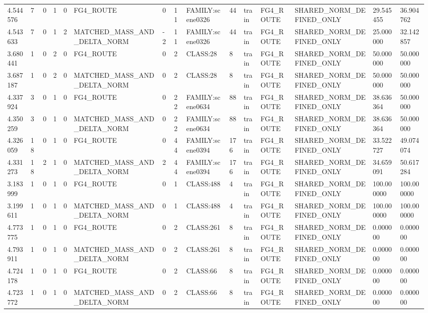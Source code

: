 \begin{tabular}{lllllllllllllll}
4.544576 & 7 & 0 & 1 & 0 & FG4\_ROUTE & 0 & 11 & FAMILY:scene0326 & 44 & train & FG4\_ROUTE & SHARED\_NORM\_DEFINED\_ONLY & 29.545455 & 36.904762 \\
4.543633 & 7 & 0 & 1 & 2 & MATCHED\_MASS\_AND\_DELTA\_NORM & -2 & 11 & FAMILY:scene0326 & 44 & train & FG4\_ROUTE & SHARED\_NORM\_DEFINED\_ONLY & 25.000000 & 32.142857 \\
3.680441 & 1 & 0 & 2 & 0 & FG4\_ROUTE & 0 & 2 & CLASS:28 & 8 & train & FG4\_ROUTE & SHARED\_NORM\_DEFINED\_ONLY & 50.000000 & 50.000000 \\
3.687187 & 1 & 0 & 2 & 0 & MATCHED\_MASS\_AND\_DELTA\_NORM & 0 & 2 & CLASS:28 & 8 & train & FG4\_ROUTE & SHARED\_NORM\_DEFINED\_ONLY & 50.000000 & 50.000000 \\
4.337924 & 3 & 0 & 1 & 0 & FG4\_ROUTE & 0 & 22 & FAMILY:scene0634 & 88 & train & FG4\_ROUTE & SHARED\_NORM\_DEFINED\_ONLY & 38.636364 & 50.000000 \\
4.350259 & 3 & 0 & 1 & 0 & MATCHED\_MASS\_AND\_DELTA\_NORM & 0 & 22 & FAMILY:scene0634 & 88 & train & FG4\_ROUTE & SHARED\_NORM\_DEFINED\_ONLY & 38.636364 & 50.000000 \\
4.326059 & 18 & 0 & 1 & 0 & FG4\_ROUTE & 0 & 44 & FAMILY:scene0394 & 176 & train & FG4\_ROUTE & SHARED\_NORM\_DEFINED\_ONLY & 33.522727 & 49.074074 \\
4.331273 & 18 & 2 & 1 & 0 & MATCHED\_MASS\_AND\_DELTA\_NORM & 2 & 44 & FAMILY:scene0394 & 176 & train & FG4\_ROUTE & SHARED\_NORM\_DEFINED\_ONLY & 34.659091 & 50.617284 \\
3.183999 & 1 & 0 & 1 & 0 & FG4\_ROUTE & 0 & 1 & CLASS:488 & 4 & train & FG4\_ROUTE & SHARED\_NORM\_DEFINED\_ONLY & 100.000000 & 100.000000 \\
3.199611 & 1 & 0 & 1 & 0 & MATCHED\_MASS\_AND\_DELTA\_NORM & 0 & 1 & CLASS:488 & 4 & train & FG4\_ROUTE & SHARED\_NORM\_DEFINED\_ONLY & 100.000000 & 100.000000 \\
4.773775 & 1 & 0 & 1 & 0 & FG4\_ROUTE & 0 & 2 & CLASS:261 & 8 & train & FG4\_ROUTE & SHARED\_NORM\_DEFINED\_ONLY & 0.000000 & 0.000000 \\
4.793911 & 1 & 0 & 1 & 0 & MATCHED\_MASS\_AND\_DELTA\_NORM & 0 & 2 & CLASS:261 & 8 & train & FG4\_ROUTE & SHARED\_NORM\_DEFINED\_ONLY & 0.000000 & 0.000000 \\
4.724178 & 1 & 0 & 1 & 0 & FG4\_ROUTE & 0 & 2 & CLASS:66 & 8 & train & FG4\_ROUTE & SHARED\_NORM\_DEFINED\_ONLY & 0.000000 & 0.000000 \\
4.723772 & 1 & 0 & 1 & 0 & MATCHED\_MASS\_AND\_DELTA\_NORM & 0 & 2 & CLASS:66 & 8 & train & FG4\_ROUTE & SHARED\_NORM\_DEFINED\_ONLY & 0.000000 & 0.000000 \\

\end{tabular}
